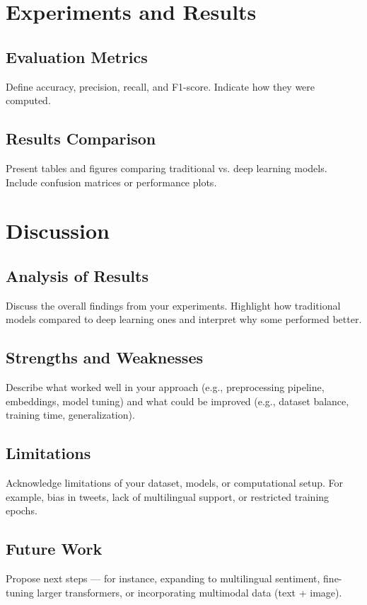 \documentclass[10pt]{article}
\begin{document}
\section{Experiments and Results}
\subsection{Evaluation Metrics} %
Define accuracy, precision, recall, and F1-score. Indicate how they were computed.

\subsection{Results Comparison} %
Present tables and figures comparing traditional vs. deep learning models. Include confusion matrices or performance plots.

\section{Discussion}
\subsection{Analysis of Results}
Discuss the overall findings from your experiments. Highlight how traditional models compared to deep learning ones and interpret why some performed better.

\subsection{Strengths and Weaknesses}
Describe what worked well in your approach (e.g., preprocessing pipeline, embeddings, model tuning) and what could be improved (e.g., dataset balance, training time, generalization).

\subsection{Limitations} %
Acknowledge limitations of your dataset, models, or computational setup. For example, bias in tweets, lack of multilingual support, or restricted training epochs.

\subsection{Future Work}
Propose next steps — for instance, expanding to multilingual sentiment, fine-tuning larger transformers, or incorporating multimodal data (text + image).
\end{document}

